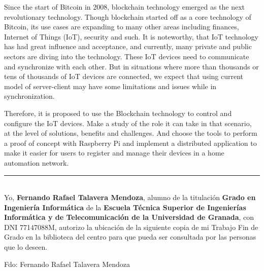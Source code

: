 
\vspace{0.7cm}

\vspace{5mm}

Since the start of Bitcoin in 2008, blockchain technology emerged as the next revolutionary technology. 
Though blockchain started off as a core technology of Bitcoin, its use cases are expanding to many other 
areas including finances, Internet of Things (IoT), security and such. It is noteworthy, that IoT technology 
has had great influence and acceptance, and currently, many private and public sectors are diving into the 
technology. These IoT devices need to communicate and synchronize with each other. But in situations where 
more than thousands or tens of thousands of IoT devices are connected, we expect that using current model of 
server-client may have some limitations and issues while in synchronization.

\vspace{5mm}

\noindent Therefore, it is proposed to use the Blockchain technology to control and configure the IoT devices. 
Make a study of the role it can take in that scenario, at the level of solutions, benefits and challenges. 
And choose the tools to perform a proof of concept with Raspberry Pi and implement a distributed application 
to make it easier for users to register and manage their devices in a home automation network.

\clearpage
\thispagestyle{empty}

\noindent\rule[-1ex]{\textwidth}{2pt}\\[4.5ex]

Yo, \textbf{Fernando Rafael Talavera Mendoza}, alumno de la titulación \textbf{Grado en Ingeniería Informática} 
de la \textbf{Escuela Técnica Superior de Ingenierías Informática y de Telecomunicación de la Universidad de Granada}, 
con DNI 77147088M, autorizo la ubicación de la siguiente copia de mi Trabajo Fin de Grado en la biblioteca del centro 
para que pueda ser consultada por las personas que lo deseen.

\vspace{6cm}

\noindent Fdo: Fernando Rafael Talavera Mendoza

\vspace{2cm}

